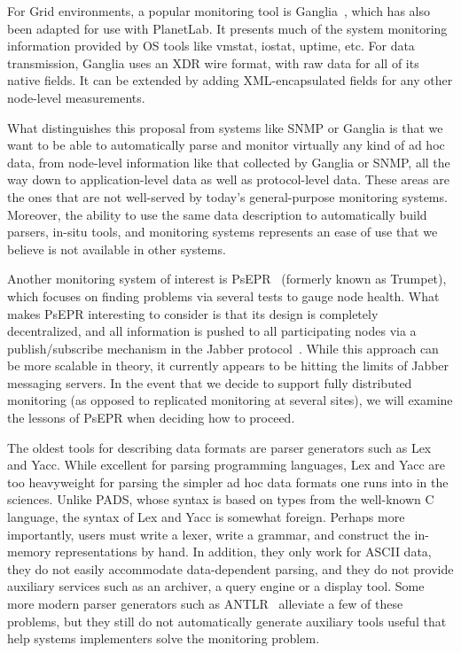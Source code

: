 \documentclass[10pt]{article}
\begin{document}
For Grid environments, a popular monitoring tool is
Ganglia~\cite{ganglia}, which has also been adapted for use with
PlanetLab. It presents much of the system monitoring information
provided by OS tools like vmstat, iostat, uptime, etc. For data
transmission, Ganglia uses an XDR wire format, with raw data for all
of its native fields.  It can be extended by adding XML-encapsulated
fields for any other node-level measurements. 

What distinguishes this proposal from systems like SNMP or Ganglia is
that we want to be able to automatically parse and monitor virtually
any kind of ad hoc data, from node-level information like that
collected by Ganglia or SNMP, all the way down to application-level
data as well as protocol-level data. These areas are the ones that are
not well-served by today's general-purpose monitoring
systems. Moreover, the ability to use the same data description to
automatically build parsers, in-situ tools, and monitoring systems
represents an ease of use that we believe is not available in other
systems.

Another monitoring system of interest is PsEPR~\cite{psepr} (formerly
known as Trumpet), which focuses on finding problems via several tests
to gauge node health. What makes PsEPR interesting to consider is that
its design is completely decentralized, and all information is pushed
to all participating nodes via a publish/subscribe mechanism in the
Jabber protocol~\cite{jabber}. While this approach can be more
scalable in theory, it currently appears to be hitting the limits of
Jabber messaging servers. In the event that we decide to support
fully distributed monitoring (as opposed to replicated monitoring at
several sites), we will examine the lessons of PsEPR when deciding how
to proceed.


The oldest tools for describing data formats are parser generators such as
Lex and Yacc.  While excellent for parsing programming languages, Lex and Yacc
are too heavyweight for parsing the simpler ad hoc data formats one
runs into in the sciences.   
Unlike PADS, whose syntax is based on types from the well-known C language,
the syntax of Lex and Yacc is somewhat foreign.  Perhaps more importantly,
users must write a lexer, write a
grammar, and construct the in-memory representations by hand.  In
addition, they only work for ASCII data, they do not easily
accommodate data-dependent parsing, and they do not provide auxiliary
services such as an archiver, a query engine or a display tool.
Some more modern parser generators such as ANTLR~\cite{antlr} alleviate
a few of these problems, but they still do not automatically generate auxiliary tools
useful that help systems implementers solve the monitoring problem. 
\end{document}
